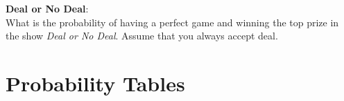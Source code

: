 \frmrule

\begin{example}
\textbf{Deal or No Deal}:\\
What is the probability of having a perfect game and winning the top prize in the show \textit{Deal or No Deal}.
Assume that you always accept deal. 

\end{example}



\section{Probability Tables}

